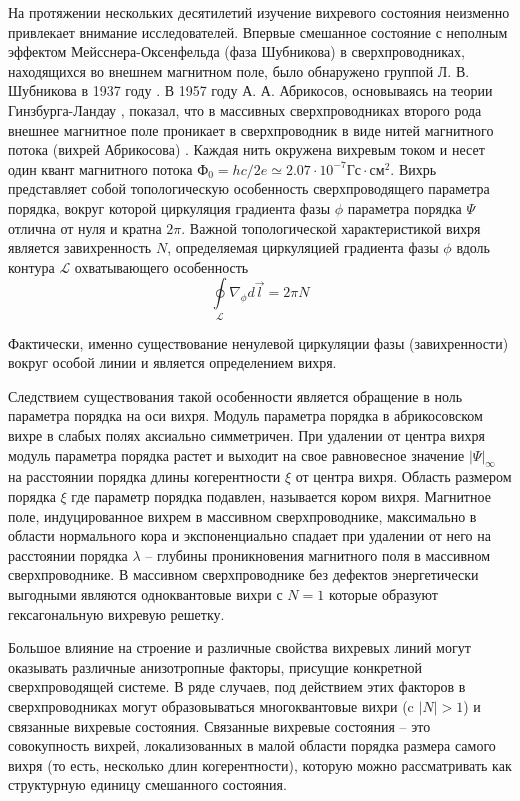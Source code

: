 На протяжении нескольких десятилетий изучение вихревого состояния неизменно 
привлекает внимание исследователей. Впервые смешанное состояние с неполным 
эффектом Мейсснера-Оксенфельда (фаза Шубникова) в сверхпроводниках, 
находящихся во внешнем магнитном поле, было обнаружено группой Л. В. 
Шубникова в 1937 году \cite{shubnikov}. В 1957 году А. А. Абрикосов, 
основываясь на теории Гинзбурга-Ландау \cite{ginzburg-landau}, показал, что в 
массивных сверхпроводниках второго рода внешнее магнитное поле проникает в 
сверхпроводник в виде нитей магнитного потока (вихрей Абрикосова)
\cite{abrikosov}. Каждая нить окружена вихревым током и несет один квант 
магнитного потока 
\( Ф_0 = hc/2e \simeq 2.07\cdot10^{-7} \text{Гс}\cdot\text{см}^2 \). Вихрь 
представляет собой топологическую особенность сверхпроводящего параметра 
порядка, вокруг которой циркуляция градиента фазы \( \phi \) параметра порядка 
\( \Psi \) отлична от нуля и кратна \( 2\pi \). Важной топологической 
характеристикой вихря является завихренность \( N \), определяемая циркуляцией 
градиента фазы \( \phi \) вдоль контура \( \mathcal{L} \) охватывающего 
особенность 
\begin{equation}
    \oint\limits_{\mathcal{L}} \nabla_\phi d\vec{l} = 2\pi N
\end{equation}

Фактически, именно существование ненулевой циркуляции фазы (завихренности) 
вокруг особой линии и является определением вихря.

Следствием существования такой особенности является обращение в ноль параметра 
порядка на оси вихря. Модуль параметра порядка в абрикосовском вихре в слабых 
полях аксиально симметричен. При удалении от центра вихря модуль параметра 
порядка растет и выходит на свое равновесное значение \( |\Psi|_\infty \) на 
расстоянии порядка длины когерентности \( \xi \) от центра вихря. Область 
размером порядка \( \xi \) где параметр порядка подавлен, называется кором 
вихря. Магнитное поле, индуцированное вихрем в массивном сверхпроводнике, 
максимально в области нормального кора и экспоненциально спадает при удалении 
от него на расстоянии порядка \( \lambda \) -- глубины проникновения магнитного 
поля в массивном сверхпроводнике. В массивном сверхпроводнике без дефектов 
энергетически выгодными являются одноквантовые вихри с \( N = 1 \) которые 
образуют гексагональную вихревую решетку.

Большое влияние на строение и различные свойства вихревых линий могут 
оказывать различные анизотропные факторы, присущие конкретной сверхпроводящей 
системе. В ряде случаев, под действием этих факторов в сверхпроводниках могут 
образовываться многоквантовые вихри (c \( |N|>1 \)) и связанные вихревые
состояния. Связанные вихревые состояния -- это совокупность вихрей, 
локализованных в малой области порядка размера самого вихря (то есть, 
несколько длин когерентности), которую можно рассматривать как структурную 
единицу смешанного состояния.

